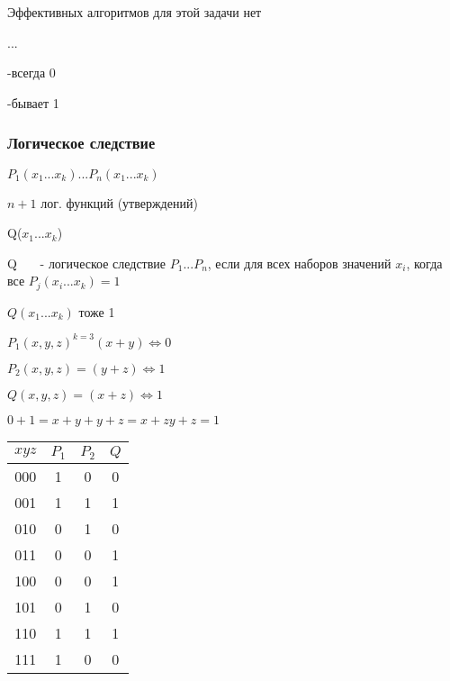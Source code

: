 \documentclass[russian]{lecture-notes}
\begin{document}
    Эффективных алгоритмов для этой задачи нет

    ...

    -всегда 0

    -бывает 1

    \subsubsection{Логическое следствие}

    \begin{definition}
        $P_{1}(x_{1}...x_{k})...P_{n}(x_{1}...x_{k})$

        $n+1$ лог. функций (утверждений)

        Q($x_{1} ... x_{k}$)

        Q ~~~- логическое следствие $P_{1} ... P_{n}$, если для всех наборов значений $x_{i}$, когда все $P_{j}(x_{i}...x_{k}) = 1$

        $Q(x_{1}...x_{k})$ тоже 1

    \end{definition}


    \begin{example}
        $P_{1}(x,y,z)^{k=3} (x+y)\Leftrightarrow 0 $

        $P_{2}(x,y,z) = (y+z) \Leftrightarrow 1$

        $Q(x,y,z) = (x+z) \Leftrightarrow 1 $

        $0+1 = x+y+y+z=x+zy+z=1$


    \end{example}

    \begin{table}[h!]
        \begin{tabular}{|c|c|c|c|}
            \hline
            $xyz$ & $P_{1}$ & $P_{2}$ & $Q$ \\ \hline
            000     & 1       & 0       & 0   \\ \hline
            001     & 1       & 1       & 1   \\ \hline
            010     & 0       & 1       & 0   \\ \hline
            011     & 0       & 0       & 1   \\ \hline
            100     & 0       & 0       & 1   \\ \hline
            101     & 0       & 1       & 0   \\ \hline
            110     & 1       & 1       & 1   \\ \hline
            111     & 1       & 0       & 0   \\ \hline
        \end{tabular}
    \end{table}
\end{document}
